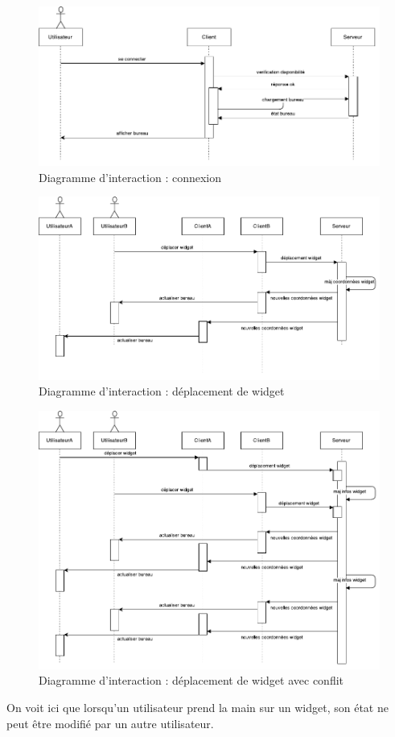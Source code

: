 \begin{figure}[H]
	\centering
	\includegraphics[angle=90]{diagrammes/DI1.pdf}
	\caption{Diagramme d'interaction : connexion}
\end{figure}

\begin{figure}[H]
	\centering
	\includegraphics[angle=90]{diagrammes/DI2.pdf}
	\caption{Diagramme d'interaction : déplacement de widget}
\end{figure}

\begin{figure}[H]
	\centering
	\includegraphics[angle=90]{diagrammes/DI3.pdf}
	\caption{Diagramme d'interaction : déplacement de widget avec conflit}
\end{figure}

On voit ici que lorsqu'un utilisateur prend la main sur un widget, son état ne peut être modifié par un autre utilisateur.